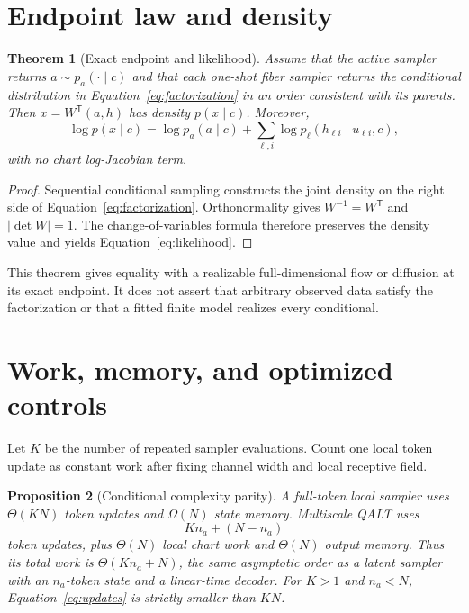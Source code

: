\documentclass[11pt]{article}
\newtheorem{theorem}{Theorem}[section]
\newtheorem{proposition}[theorem]{Proposition}
\begin{document}
\section{Endpoint law and density}

\begin{theorem}[Exact endpoint and likelihood]
Assume that the active sampler returns $a\sim p_a(\cdot\mid c)$ and that each one-shot fiber sampler returns the conditional distribution in Equation~\eqref{eq:factorization} in an order consistent with its parents.  Then $x=W^{\mathsf T}(a,h)$ has density $p(x\mid c)$.  Moreover,
\begin{equation}
\log p(x\mid c)=\log p_a(a\mid c)+\sum_{\ell,i}\log p_{\ell}(h_{\ell i}\mid u_{\ell i},c),
\label{eq:likelihood}
\end{equation}
with no chart log-Jacobian term.
\end{theorem}

\begin{proof}
Sequential conditional sampling constructs the joint density on the right side of Equation~\eqref{eq:factorization}.  Orthonormality gives $W^{-1}=W^{\mathsf T}$ and $|\det W|=1$.  The change-of-variables formula therefore preserves the density value and yields Equation~\eqref{eq:likelihood}.
\end{proof}

This theorem gives equality with a realizable full-dimensional flow or diffusion at its exact endpoint.  It does not assert that arbitrary observed data satisfy the factorization or that a fitted finite model realizes every conditional.

\section{Work, memory, and optimized controls}

Let $K$ be the number of repeated sampler evaluations.  Count one local token update as constant work after fixing channel width and local receptive field.

\begin{proposition}[Conditional complexity parity]
A full-token local sampler uses $\Theta(KN)$ token updates and $\Omega(N)$ state memory.  Multiscale QALT uses
\begin{equation}
Kn_a+(N-n_a)
\label{eq:updates}
\end{equation}
token updates, plus $\Theta(N)$ local chart work and $\Theta(N)$ output memory.  Thus its total work is $\Theta(Kn_a+N)$, the same asymptotic order as a latent sampler with an $n_a$-token state and a linear-time decoder.  For $K>1$ and $n_a<N$, Equation~\eqref{eq:updates} is strictly smaller than $KN$.
\end{proposition}
\end{document}
